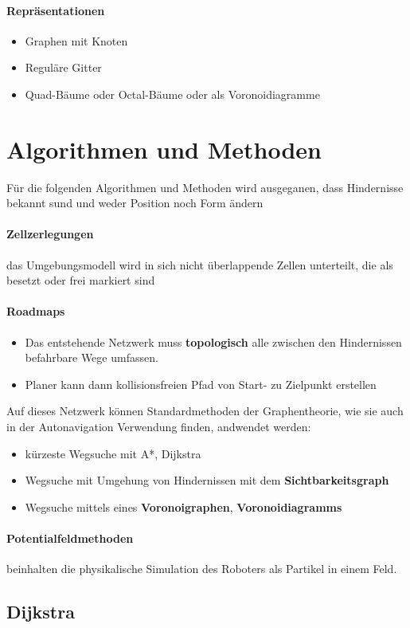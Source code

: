 \paragraph{Repräsentationen}
\begin{itemize}
	\item Graphen mit Knoten
	\item Reguläre Gitter
	\item Quad-Bäume oder Octal-Bäume oder als Voronoidiagramme
\end{itemize}
\section{Algorithmen und Methoden}
Für die folgenden Algorithmen und Methoden wird ausgeganen, dass Hindernisse bekannt sund und weder Position noch Form ändern
\paragraph{Zellzerlegungen} das Umgebungsmodell wird in sich nicht überlappende Zellen unterteilt, die als besetzt oder frei markiert sind
\paragraph{Roadmaps}
\begin{itemize}
	\item Das entstehende Netzwerk muss \textbf{topologisch} alle zwischen den Hindernissen befahrbare Wege umfassen.
	\item Planer kann dann kollisionsfreien Pfad von Start- zu Zielpunkt erstellen
\end{itemize}
Auf dieses Netzwerk können Standardmethoden der Graphentheorie, wie sie auch in der Autonavigation Verwendung finden, andwendet werden:
\begin{itemize}
	\item kürzeste Wegsuche mit A*, Dijkstra
	\item Wegsuche mit Umgehung von Hindernissen mit dem \textbf{Sichtbarkeitsgraph}
	\item Wegsuche mittels eines \textbf{Voronoigraphen}, \textbf{Voronoidiagramms}
\end{itemize}
\paragraph{Potentialfeldmethoden} beinhalten die physikalische Simulation des Roboters als Partikel in einem Feld.
\newpage
\subsection{Dijkstra}
